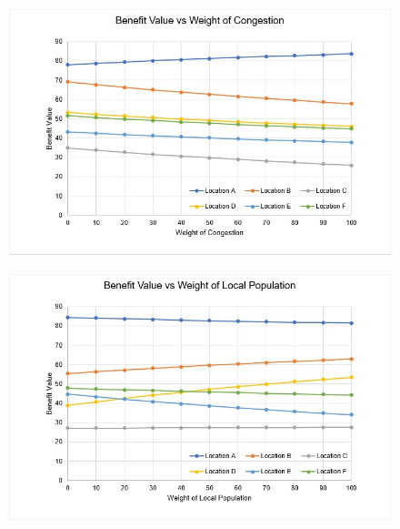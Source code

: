 \documentclass[11pt, a4paper]{article}
\begin{document}
        \begin{figure}[!ht]
            \centering
            \includegraphics[width=\textwidth]{appendices/3b.jpg}
        \end{figure}

        \begin{figure}[!ht]
            \centering
            \includegraphics[width=\textwidth]{appendices/3c.jpg}
        \end{figure}
\end{document}
